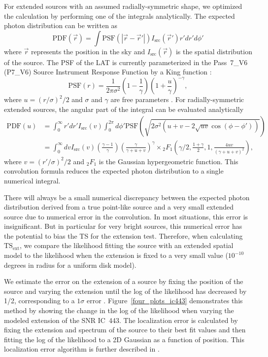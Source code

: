 \documentclass[12pt,preprint]{aastex}
\newcommand{\tsext}{{\ensuremath{\text{TS}_{\text{ext}}}}\xspace}
\begin{document}
For extended sources with an assumed radially-symmetric shape,
we optimized the calculation by performing one
of the integrals analytically.
The expected photon 
distribution can be written as
\begin{equation}
  \text{PDF}(\vec r) = \int  \text{PSF}(|\vec r - \vec r'|)I_\text{src}(\vec r') r' dr' d\phi'
\end{equation}
where $\vec r$ represents the position in the sky and
$I_\text{src}(\vec r)$ is the spatial distribution of the
source.
The PSF of the LAT is currently parameterized 
in the Pass~7\_V6 (P7\_V6) Source Instrument
Response Function \citep[IRFs,][]{lat_on_orbit_psf} by a King function \citep{king_function}:
\begin{equation}
  \text{PSF}(r) = 
  \frac{1}{2\pi\sigma^2}
  \left(1-\frac{1}{\gamma}\right)
  \left(1+\frac{u}{\gamma}\right)^{-\gamma},
\end{equation}
where $u=(r/\sigma)^2/2$ and $\sigma$ and $\gamma$ are free parameters
\citep{matthew_kerr_thesis}.  For radially-symmetric extended sources,
the angular part of the integral can be evaluated analytically
\begin{align}
  \text{PDF}(u) & = \int_0^\infty r' dr'
  I_\text{src}(v) 
  \int_0^{2\pi} d\phi' 
  \text{PSF}(\sqrt{2\sigma^2(u+v-2\sqrt{uv}\cos(\phi-\phi'))})
  \\
  & = \int_0^\infty dv
  I_\text{src}(v) 
  \left(\frac{\gamma-1}{\gamma}\right)
  \left( \frac{\gamma}{\gamma + u + v}\right)^\gamma 
  \times {}_2F_1 \left(\gamma/2,\frac{1+\gamma}{2},1,\frac{4uv}{(\gamma+u+v)^2}\right),
\end{align}
where $v=(r'/\sigma)^2/2$ and ${}_2F_1$ is the Gaussian hypergeometric
function.  This convolution formula reduces the expected photon
distribution to a single numerical integral.

There will always be a small numerical discrepancy between the expected
photon distribution derived from a true point-like source and a very small
extended source due to numerical error in the convolution.  In most
situations, this error is insignificant.  But in particular for
very bright sources, this numerical error has the potential to bias the
TS for the extension test. Therefore, when calculating
\tsext, we compare the likelihood fitting the source with an extended
spatial model to the likelihood when the extension is
fixed to a very small value ($10^{-10}$ degrees in radius 
for a uniform disk model).

We estimate the error on the extension of a source by fixing
the position of the source and varying the extension until the
log of the likelihood has decreased by 1/2, corresponding to a $1\sigma$ error
\citep{Statistical_methods_book}.  Figure~\ref{four_plots_ic443}
demonstrates this method by showing the change in the log of the
likelihood when 
varying the modeled extension of the SNR IC~443.  The localization
error is calculated by fixing the extension and spectrum of the source
to their best fit values and then
fitting the log of the likelihood to
a 2D Gaussian as a function
of position. This localization error algorithm is further described in
\cite{second_cat}.
\end{document}
